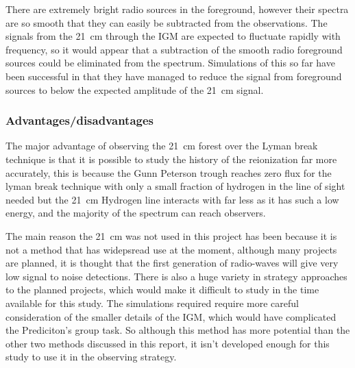             There are extremely bright radio sources in the foreground, however their spectra are so smooth that they can easily be subtracted from the observations\cite{Petrovic}. The signals from the \SI{21}{\centi\metre} through the IGM are expected to fluctuate rapidly with frequency, so it would appear that a subtraction of the smooth radio foreground sources could be eliminated from the spectrum. Simulations of this so far have been successful in that they have managed to reduce the signal from foreground sources to below the expected amplitude of the \SI{21}{\centi\metre} signal\cite{Liu2011}.

        \subsubsection{Advantages/disadvantages} %
    	\label{subsub:Advantages_disadvantages_21cm}
            The major advantage of observing the \SI{21}{\centi\metre} forest over the Lyman break technique is that it is possible to study the history of the reionization far more accurately, this is because the Gunn Peterson trough reaches zero flux for the lyman break technique with only a small fraction of hydrogen in the line of sight needed  but the \SI{21}{\centi\metre} Hydrogen line interacts with far less as it has such a low energy, and the majority of the spectrum can reach observers.

            The main reason the \SI{21}{\centi\metre} was not used in this project has been because it is not a method that has widepsread use at the moment, although many projects are planned, it is thought that the first generation of radio-waves will give very low signal to noise detections. There is also a huge variety in strategy approaches to the planned projects\cite{Parsons}, which would make it difficult to study in the time available for this study. The simulations required require more careful consideration of the smaller details of the IGM\cite{McGreer}, which would have complicated the Prediciton's group task. So although this method has more potential than the other two methods discussed in this report, it isn't developed enough for this study to use it in the observing strategy.

